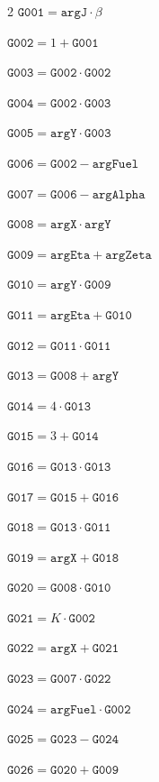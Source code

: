 \documentclass[10pt]{article}
\begin{document}
\begin{multicols}{2}\fontsize{8}{9}\selectfont
\noindent $\mathtt{G001}=\mathtt{argJ}\cdot \beta$\par
\noindent $\mathtt{G002}=1+\mathtt{G001}$\par
\noindent $\mathtt{G003}=\mathtt{G002}\cdot \mathtt{G002}$\par
\noindent $\mathtt{G004}=\mathtt{G002}\cdot \mathtt{G003}$\par
\noindent $\mathtt{G005}=\mathtt{argY}\cdot \mathtt{G003}$\par
\noindent $\mathtt{G006}=\mathtt{G002}-\mathtt{argFuel}$\par
\noindent $\mathtt{G007}=\mathtt{G006}-\mathtt{argAlpha}$\par
\noindent $\mathtt{G008}=\mathtt{argX}\cdot \mathtt{argY}$\par
\noindent $\mathtt{G009}=\mathtt{argEta}+\mathtt{argZeta}$\par
\noindent $\mathtt{G010}=\mathtt{argY}\cdot \mathtt{G009}$\par
\noindent $\mathtt{G011}=\mathtt{argEta}+\mathtt{G010}$\par
\noindent $\mathtt{G012}=\mathtt{G011}\cdot \mathtt{G011}$\par
\noindent $\mathtt{G013}=\mathtt{G008}+\mathtt{argY}$\par
\noindent $\mathtt{G014}=4\cdot \mathtt{G013}$\par
\noindent $\mathtt{G015}=3+\mathtt{G014}$\par
\noindent $\mathtt{G016}=\mathtt{G013}\cdot \mathtt{G013}$\par
\noindent $\mathtt{G017}=\mathtt{G015}+\mathtt{G016}$\par
\noindent $\mathtt{G018}=\mathtt{G013}\cdot \mathtt{G011}$\par
\noindent $\mathtt{G019}=\mathtt{argX}+\mathtt{G018}$\par
\noindent $\mathtt{G020}=\mathtt{G008}\cdot \mathtt{G010}$\par
\noindent $\mathtt{G021}=K\cdot \mathtt{G002}$\par
\noindent $\mathtt{G022}=\mathtt{argX}+\mathtt{G021}$\par
\noindent $\mathtt{G023}=\mathtt{G007}\cdot \mathtt{G022}$\par
\noindent $\mathtt{G024}=\mathtt{argFuel}\cdot \mathtt{G002}$\par
\noindent $\mathtt{G025}=\mathtt{G023}-\mathtt{G024}$\par
\noindent $\mathtt{G026}=\mathtt{G020}+\mathtt{G009}$\par

\end{multicols}
\end{document}
